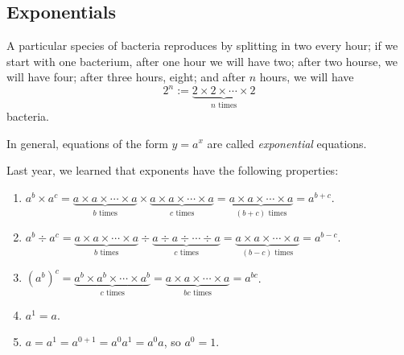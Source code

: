 



\subsection*{Exponentials}
A particular species of bacteria reproduces by splitting in two every hour; if we start with one bacterium, after one hour we will
have two; after two hourse, we will have four; after three hours, eight; and after $ n $ hours, we will have
\begin{displaymath}
  2^n := \underbrace{2 \times 2 \times \cdots \times 2}_{n \text{ times}}
\end{displaymath}
bacteria.

In general, equations of the form $ y = a^x $ are called \emph{exponential} equations.

\begin{center}
\end{center}

Last year, we learned that exponents have the following properties:
\begin{enumerate}
  \item $ a^b \times a^c = \underbrace{a \times a \times \cdots \times a}_{b \text{ times}} \times \underbrace{a \times a \times \cdots \times a}_{c \text{ times}} = \underbrace{a \times a \times \cdots \times a}_{(b + c) \text{ times}} = a^{b + c} $.
  \item $ a^b \div a^c = \underbrace{a \times a \times \cdots \times a}_{b \text{ times}} \div \underbrace{a \div a \div \cdots \div a}_{c \text{ times}} = \underbrace{a \times a \times \cdots \times a}_{(b - c) \text{ times}} = a^{b - c} $.
  \item $ \left(a^b\right)^c = \underbrace{a^b \times a^b \times \cdots \times a^b}_{c \text{ times}} = \underbrace{a \times a \times \cdots \times a}_{bc \text{ times}}  = a^{bc}$.
  \item $ a^1 = a $.
  \item $ a = a^1 = a^{0 + 1} = a^0 a^1 = a^0 a  $, so $ a^0 = 1 $.
\end{enumerate}

